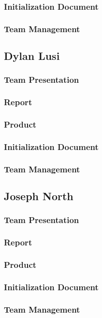\documentclass[12pt]{article}
\begin{document}
\begin{spacing}{1.5}
\subsubsection{Initialization Document}
\subsubsection{Team Management}
\subsection{Dylan Lusi}
\subsubsection{Team Presentation}
\subsubsection{Report}
\subsubsection{Product}
\subsubsection{Initialization Document}
\subsubsection{Team Management}
\subsection{Joseph North}
\subsubsection{Team Presentation}
\subsubsection{Report}
\subsubsection{Product}
\subsubsection{Initialization Document}
\subsubsection{Team Management}

\end{spacing}
\end{document}
